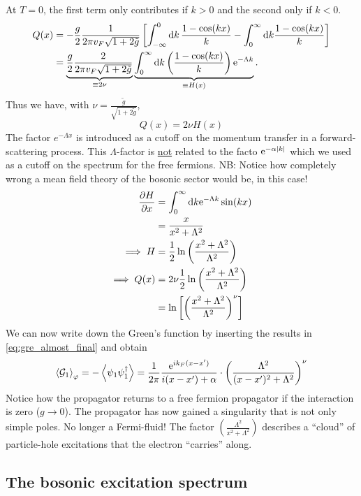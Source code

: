 At $T = 0$, the first term only contributes if $k>0$ and the second only if $k<0$. 
\begin{align*}
	Q(x) &= -\frac{g}{2}\frac{1}{2\pi v_F\sqrt{1+2\tilde{g}}}\left[\int_{-\infty}^{0}\dd{k}\frac{1-\cos(kx)}{k}-\int_0^\infty\dd k\frac{1-\cos(kx)}{k}\right] \\
	&=\underbrace{\frac{g}{2}\frac{2}{2\pi v_F\sqrt{1+2\tilde{g}}}}_{\equiv 2\nu}\underbrace{\int_0^\infty\dd k\left(\frac{1-\cos(kx)}{k}\right)\mathrm{e}^{-\Lambda k}}_{\equiv H(x)}.
\end{align*}
Thus we have, with \(\nu = \frac{\tilde{g}}{\sqrt{1+2\tilde{g}}}\),
\begin{equation}
Q(x) = 2\nu H(x)
\end{equation}
The factor \(e^{-\Lambda x}\) is introduced as a cutoff on the momentum transfer in a forward-scattering process. This \(\Lambda\)-factor is \underline{not} related to the facto \(\mathrm{e}^{-\alpha|k|}\) which we used as a cutoff on the spectrum for the free fermions. NB: Notice how completely wrong a mean field theory of the bosonic sector would be, in this case!
\begin{align*}
\pdv{H}{x} &= \int_0^\infty\dd k \mathrm{e}^{-\Lambda k}\sin(kx) \\
&= \frac{x}{x^2+\Lambda^2} \\
\implies H &= \frac12\ln\left(\frac{x^2+\Lambda^2}{\Lambda^2}\right) \\
\implies Q(x) &= 2\nu\frac12\ln\left(\frac{x^2+\Lambda^2}{\Lambda^2}\right) \\
&= \ln\left[\left(\frac{x^2+\Lambda^2}{\Lambda^2}\right)^\nu\right] 
\end{align*}
We can now write down the Green's function by inserting the results in \cref{eq:gre_almost_final} and obtain
\begin{equation}
\ev{\gre_1}_\p = -\ev{\psi_1\psi_1^\dagger} = \frac{1}{2\pi}\frac{\e^{ik_F(x-x')}}{i(x-x')+\alpha}\cdot\left(\frac{\Lambda^2}{(x-x')^2+\Lambda^2}\right)^\nu
\end{equation}
Notice how the propagator returns to a free fermion propagator if the interaction is zero (\(g\rightarrow0\)). 
The propagator has now gained a singularity that is not only simple poles. No longer a Fermi-fluid!
The factor \(\left(\frac{\Lambda^2}{x^2+\Lambda^2}\right)\) describes a ``cloud'' of particle-hole excitations that the electron ``carries'' along.


\subsection{The bosonic excitation spectrum} %


